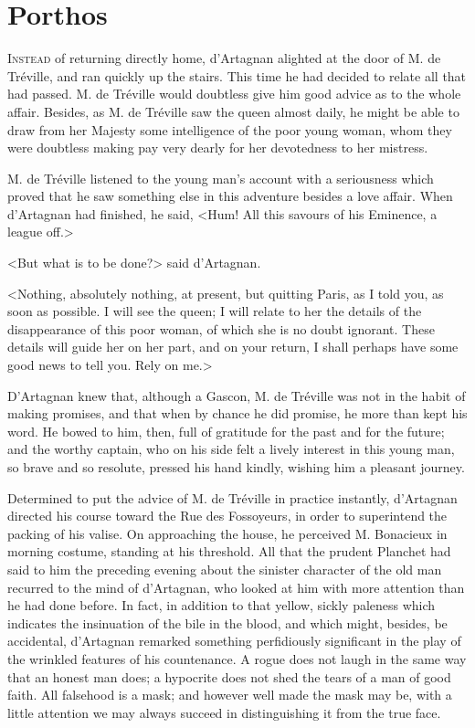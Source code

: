 
\chapter{Porthos}

\lettrine[]{I}{nstead} of returning directly home, d'Artagnan alighted at the door of M. de Tréville, and ran quickly up the stairs. This time he had decided to relate all that had passed. M. de Tréville would doubtless give him good advice as to the whole affair. Besides, as M. de Tréville saw the queen almost daily, he might be able to draw from her Majesty some intelligence of the poor young woman, whom they were doubtless making pay very dearly for her devotedness to her mistress. 

M. de Tréville listened to the young man's account with a seriousness which proved that he saw something else in this adventure besides a love affair. When d'Artagnan had finished, he said, <Hum! All this savours of his Eminence, a league off.> 

<But what is to be done?> said d'Artagnan. 

<Nothing, absolutely nothing, at present, but quitting Paris, as I told you, as soon as possible. I will see the queen; I will relate to her the details of the disappearance of this poor woman, of which she is no doubt ignorant. These details will guide her on her part, and on your return, I shall perhaps have some good news to tell you. Rely on me.> 

D'Artagnan knew that, although a Gascon, M. de Tréville was not in the habit of making promises, and that when by chance he did promise, he more than kept his word. He bowed to him, then, full of gratitude for the past and for the future; and the worthy captain, who on his side felt a lively interest in this young man, so brave and so resolute, pressed his hand kindly, wishing him a pleasant journey. 

Determined to put the advice of M. de Tréville in practice instantly, d'Artagnan directed his course toward the Rue des Fossoyeurs, in order to superintend the packing of his valise. On approaching the house, he perceived M. Bonacieux in morning costume, standing at his threshold. All that the prudent Planchet had said to him the preceding evening about the sinister character of the old man recurred to the mind of d'Artagnan, who looked at him with more attention than he had done before. In fact, in addition to that yellow, sickly paleness which indicates the insinuation of the bile in the blood, and which might, besides, be accidental, d'Artagnan remarked something perfidiously significant in the play of the wrinkled features of his countenance. A rogue does not laugh in the same way that an honest man does; a hypocrite does not shed the tears of a man of good faith. All falsehood is a mask; and however well made the mask may be, with a little attention we may always succeed in distinguishing it from the true face. 

